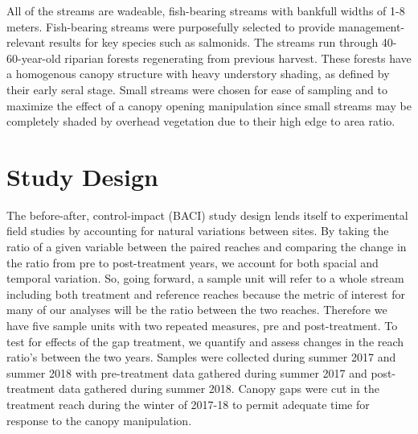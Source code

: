\documentclass[double,12pt]{beavtex}
\begin{document}
  All of the streams are wadeable, fish-bearing streams with bankfull
  widths of 1-8 meters. Fish-bearing streams were purposefully selected to
  provide management-relevant results for key species such as salmonids.
  The streams run through 40-60-year-old riparian forests regenerating
  from previous harvest. These forests have a homogenous canopy structure
  with heavy understory shading, as defined by their early seral stage.
  Small streams were chosen for ease of sampling and to maximize the
  effect of a canopy opening manipulation since small streams may be
  completely shaded by overhead vegetation due to their high edge to area
  ratio.
  
  \begin{table}[t]
  
  \caption{\label{tab:table1}Study site attributes}
  \centering
  \end{table}
  
  \section*{Study Design}\label{study-design}
  
  The before-after, control-impact (BACI) study design lends itself to
  experimental field studies by accounting for natural variations between
  sites. By taking the ratio of a given variable between the paired
  reaches and comparing the change in the ratio from pre to post-treatment
  years, we account for both spacial and temporal variation. So, going
  forward, a sample unit will refer to a whole stream including both
  treatment and reference reaches because the metric of interest for many
  of our analyses will be the ratio between the two reaches. Therefore we
  have five sample units with two repeated measures, pre and
  post-treatment. To test for effects of the gap treatment, we quantify
  and assess changes in the reach ratio's between the two years. Samples
  were collected during summer 2017 and summer 2018 with pre-treatment
  data gathered during summer 2017 and post-treatment data gathered during
  summer 2018. Canopy gaps were cut in the treatment reach during the
  winter of 2017-18 to permit adequate time for response to the canopy
  manipulation.
  
\end{document}
